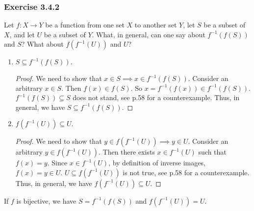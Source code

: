 \documentclass[12pt, letter]{article}
\begin{document}
\subsubsection*{Exercise 3.4.2}
Let $f:X\to Y$ be a function from one set $X$ to another set $Y$, let $S$ be a subset of $X$, and let $U$ be a subset of $Y$.
What, in general, can one say about $f^{-1}(f(S))$ and $S$? What about $f(f^{-1}(U))$ and $U$?
\begin{enumerate}
    \item $S\subseteq f^{-1}(f(S))$.
    \begin{proof}
        We need to show that $x\in S\implies x\in f^{-1}(f(S))$. Consider an arbitrary $x\in S$. Then $f(x)\in f(S)$. So $x=f^{-1}(f(x))\in f^{-1}(f(S))$. 
        $f^{-1}(f(S))\subseteq S$ does not stand, see p.58 for a counterexample. Thus, in general, we have $S\subseteq f^{-1}(f(S))$.
    \end{proof}
    \item $f(f^{-1}(U))\subseteq U$.
    \begin{proof}
        We need to show that $y\in f(f^{-1}(U))\implies y\in U$. Consider an arbitrary $y\in f(f^{-1}(U))$. Then there exists $x\in f^{-1}(U)$ such that $f(x)=y$. 
        Since $x\in f^{-1}(U)$, by definition of inverse images, $f(x)=y\in U$. $U\subseteq f(f^{-1}(U))$ is not true, see p.58 for a counterexample. Thus, in general, we have
        $f(f^{-1}(U))\subseteq U$.
    \end{proof}
\end{enumerate}
If $f$ is bijective, we have $S=f^{-1}(f(S))$ and $f(f^{-1}(U))=U$.
\end{document}
